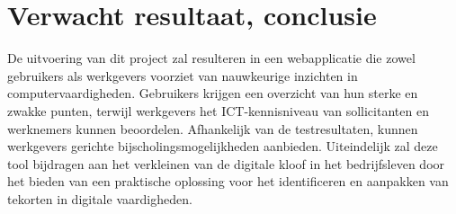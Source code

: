 \section{Verwacht resultaat, conclusie}%
\label{sec:verwachte_resultaten}




De uitvoering van dit project zal resulteren in een webapplicatie die zowel gebruikers als werkgevers voorziet van nauwkeurige inzichten in computervaardigheden. Gebruikers krijgen een  overzicht van hun sterke en zwakke punten, terwijl werkgevers het ICT-kennisniveau van sollicitanten en werknemers kunnen beoordelen. Afhankelijk van de testresultaten, kunnen werkgevers gerichte bijscholingsmogelijkheden aanbieden. Uiteindelijk zal deze tool bijdragen aan het verkleinen van de digitale kloof in het bedrijfsleven door het bieden van een praktische oplossing voor het identificeren en aanpakken van tekorten in digitale vaardigheden.